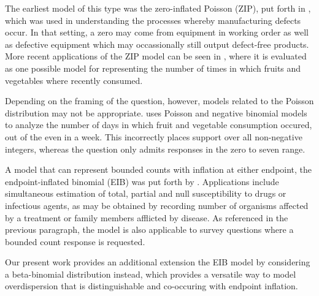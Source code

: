 The earliest model of this type was the zero-inflated Poisson (ZIP), put forth in \cite{lambert1992zero}, which was used in understanding the processes whereby manufacturing defects occur. In that setting, a zero may come from equipment in working order as well as defective equipment which may occassionally still output defect-free products. More recent applications of the ZIP model can be seen in \cite{wang2017availability}, where it is evaluated as one possible model for representing the number of times in which fruits and vegetables where recently consumed.

Depending on the framing of the question, however, models related to the Poisson distribution may not be appropriate. \cite{yen2011fruit} uses Poisson and negative binomial models to analyze the number of days in which fruit and vegetable consumption occured, out of the even in a week. This incorrectly places support over all non-negative integers, whereas the question only admits responses in the zero to seven range.

A model that can represent bounded counts with inflation at either endpoint, the endpoint-inflated binomial (EIB) was put forth by \cite{Tian2015}. Applications include simultaneous estimation of total, partial and null susceptibility to drugs or infectious agents, as may be obtained by recording number of organisms affected by a treatment or family members afflicted by disease. As referenced in the previous paragraph, the model is also applicable to survey questions where a bounded count response is requested.

Our present work provides an additional extension the EIB model by considering a beta-binomial distribution instead, which provides a versatile way to model overdispersion that is distinguishable and co-occuring with endpoint inflation.